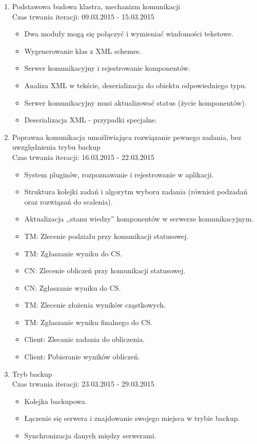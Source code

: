 \documentclass[a4paper]{article}
\begin{document}
	\begin{enumerate}
		\item Podstawowa budowa klastra, mechanizm komunikacji\\
				Czas trwania iteracji: 09.03.2015 - 15.03.2015
		\begin{itemize}
			\item Dwa moduły mogą się połączyć i wymieniać wiadomości tekstowe.
			\item Wygenerowanie klas z XML schemes.
			\item Serwer komunikacyjny i rejestrowanie komponentów.
			\item Analiza XML w tekście, deserializacja do obiektu odpowiedniego typu.
			\item Serwer komunikacyjny musi aktualizować status (życie komponentów).
			\item Deserializacja XML - przypadki specjalne.
		\end{itemize}
		\item Poprawna komunikacja umożliwiająca rozwiązanie pewnego zadania, bez uwzględnienia trybu backup\\
				Czas trwania iteracji: 16.03.2015 - 22.03.2015 
		\begin{itemize}
			\item System pluginów, rozpoznawanie i rejestrowanie w aplikacji.
			\item Struktura kolejki zadań i algorytm wyboru zadania (również podzadań oraz rozwiązań do scalenia).
			\item Aktualizacja ,,stanu wiedzy'' komponentów w serwerze komunikacyjnym.
			\item TM: Zlecenie podziału przy komunikacji statusowej.
			\item TM: Zgłaszanie wyniku do CS.
			\item CN: Zlecenie obliczeń przy komunikacji statusowej.
			\item CN: Zgłaszanie wyniku do CS.
			\item TM: Zlecenie złożenia wyników cząstkowych.
			\item TM: Zgłaszanie wyniku finalnego do CS.
			\item Client: Zlecanie zadania do obliczenia.
			\item Client: Pobieranie wyników obliczeń.
		\end{itemize}
		\item Tryb backup\\
				Czas trwania iteracji: 23.03.2015 - 29.03.2015
		\begin{itemize}
			\item Kolejka backupowa.
			\item Łączenie się serwera i znajdowanie swojego miejsca w trybie backup.
			\item Synchronizacja danych między serwerami.
		\end{itemize}
	\end{enumerate}	 
	
\end{document}
